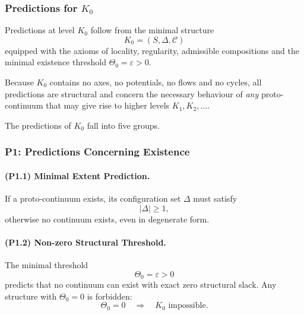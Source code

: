 

\subsubsection{Predictions for \texorpdfstring{$K_0$}{K_0}}
\label{sec:predictions-k0}

Predictions at level $K_0$ follow from the minimal structure
\[
K_0 = (S, \Delta, \mathcal{C})
\]
equipped with the axioms of locality, regularity, admissible compositions
and the minimal existence threshold $\Theta_0 = \varepsilon > 0$.

Because $K_0$ contains no axes, no potentials, no flows and no cycles,
all predictions are structural and concern the necessary behaviour of
\emph{any} proto-continuum that may give rise to higher levels $K_1, K_2,\dots$.

The predictions of $K_0$ fall into five groups.

\subsubsection{P1: Predictions Concerning Existence}

\paragraph{(P1.1) Minimal Extent Prediction.}
If a proto-continuum exists, its configuration set $\Delta$ must satisfy
\[
|\Delta| \ge 1,
\]
otherwise no continuum exists, even in degenerate form.

\paragraph{(P1.2) Non-zero Structural Threshold.}
The minimal threshold
\[
\Theta_0 = \varepsilon > 0
\]
predicts that no continuum can exist with exact zero structural slack.
Any structure with $\Theta_0 = 0$ is forbidden:
\[
\Theta_0 = 0 \quad\Rightarrow\quad K_0 \text{ impossible}.
\]


